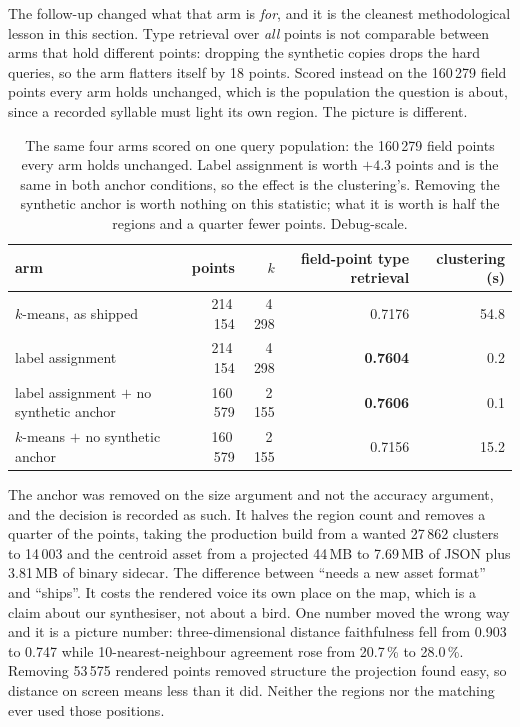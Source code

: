 \documentclass[10pt,twocolumn,a4paper]{article}
\begin{document}
The follow-up changed what that arm is \emph{for}, and it is the cleanest methodological
lesson in this section. Type retrieval over \emph{all} points is not comparable between arms
that hold different points: dropping the synthetic copies drops the hard queries, so the arm
flatters itself by 18 points. Scored instead on the 160\,279 field points every arm holds
unchanged, which is the population the question is about, since a recorded syllable must
light its own region. The picture is different.

\begin{table}[t]
\centering
\small
\caption{The same four arms scored on one query population: the 160\,279 field points every
arm holds unchanged. Label assignment is worth $+4.3$ points and is the same in both anchor
conditions, so the effect is the clustering's. Removing the synthetic anchor is worth
nothing on this statistic; what it is worth is half the regions and a quarter fewer points.
Debug-scale.}
\label{tab:w5}
\begin{tabular}{L{6.6cm} r r r r}
\toprule
arm & points & $k$ & field-point type retrieval & clustering (s) \\
\midrule
$k$-means, as shipped & 214\,154 & 4\,298 & 0.7176 & 54.8 \\
label assignment & 214\,154 & 4\,298 & \textbf{0.7604} & 0.2 \\
label assignment $+$ no synthetic anchor & 160\,579 & 2\,155 & \textbf{0.7606} & 0.1 \\
$k$-means $+$ no synthetic anchor & 160\,579 & 2\,155 & 0.7156 & 15.2 \\
\bottomrule
\end{tabular}
\end{table}

The anchor was removed on the size argument and not the accuracy argument, and the decision is
recorded as such. It halves the region count and removes a quarter of the points, taking the
production build from a wanted 27\,862 clusters to 14\,003 and the centroid asset from a
projected 44\,MB to 7.69\,MB of JSON plus 3.81\,MB of binary sidecar. The difference
between ``needs a new asset format'' and ``ships''. It costs the rendered voice its own
place on the map, which is a claim about our synthesiser, not about a bird. One
number moved the wrong way and it is a picture number: three-dimensional distance
faithfulness fell from 0.903 to 0.747 while 10-nearest-neighbour agreement rose from
20.7\,\% to 28.0\,\%. Removing 53\,575 rendered points removed structure the projection found
easy, so distance on screen means less than it did. Neither the regions nor the matching
ever used those positions.
\end{document}
